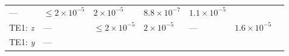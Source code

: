 \documentclass[DM,lsstdraft,toc]{lsstdoc}
\begin{document}
\begin{longtable}[]{@{}lllllll@{}}
\begin{minipage}[t]{0.06\columnwidth}
---\strut
\end{minipage} & \begin{minipage}[t]{0.14\columnwidth}\raggedright\strut
\(\leq 2\times10^{-5}\)\strut
\end{minipage} & \begin{minipage}[t]{0.14\columnwidth}\raggedright\strut
\(2\times10^{-5}\)\strut
\end{minipage} & \begin{minipage}[t]{0.12\columnwidth}\raggedright\strut
\(8.8\times10^{-7}\)\strut
\end{minipage} & \begin{minipage}[t]{0.12\columnwidth}\raggedright\strut
\(1.1\times10^{-5}\)\strut
\end{minipage} & \begin{minipage}[t]{0.17\columnwidth}\raggedright\strut
\strut
\end{minipage}\tabularnewline
\begin{minipage}[t]{0.12\columnwidth}\raggedright\strut
TE1: \emph{z}\strut
\end{minipage} & \begin{minipage}[t]{0.06\columnwidth}\raggedright\strut
---\strut
\end{minipage} & \begin{minipage}[t]{0.14\columnwidth}\raggedright\strut
\(\leq 2\times10^{-5}\)\strut
\end{minipage} & \begin{minipage}[t]{0.14\columnwidth}\raggedright\strut
\(2\times10^{-5}\)\strut
\end{minipage} & \begin{minipage}[t]{0.12\columnwidth}\raggedright\strut
---\strut
\end{minipage} & \begin{minipage}[t]{0.12\columnwidth}\raggedright\strut
\(1.6\times10^{-5}\)\strut
\end{minipage} & \begin{minipage}[t]{0.17\columnwidth}\raggedright\strut
\strut
\end{minipage}\tabularnewline
\begin{minipage}[t]{0.12\columnwidth}\raggedright\strut
TE1: \emph{y}\strut
\end{minipage} & \begin{minipage}[t]{0.06\columnwidth}\raggedright\strut
---\strut
\end{minipage} & \begin{minipage}[t]{0.14\columnwidth}\raggedright\strut

\end{minipage}
\end{longtable}
\end{document}
